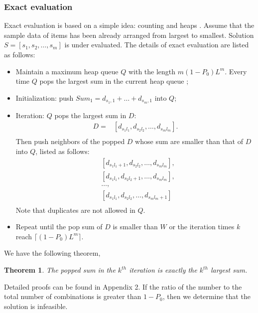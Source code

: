 \documentclass[lettersize,journal]{IEEEtran}
\newtheorem{theorem}{Theorem}[section]
\begin{document}
\subsubsection{Exact evaluation}
Exact evaluation is based on a simple idea: counting and heaps \cite{ferreira1996fast}.
Assume that the sample data of items has been already arranged from largest to smallest. 
Solution $S = [s_1,s_2,\ldots,s_m]$ is under evaluated. 
The details of exact evaluation are listed as follows:
\begin{itemize}
    \item Maintain a maximum heap queue $Q$ with the length $m(1-P_0)L^m$. Every time $Q$ pops the largest sum in the current heap queue \cite{ferreira1996fast};
    \item Initialization: push $Sum_1 = d_{s_1,1}+\ldots+d_{s_m,1}$ into $Q$;
    \item Iteration: $Q$ pops the largest sum in $D$:
    \begin{equation*}
        \begin{aligned}
           D =  &[d_{s_1l_1},d_{s_2l_2},\ldots,d_{s_ml_m}].\\
        \end{aligned}
    \end{equation*}
    Then push neighbors of the popped $D$ whose sum are smaller than that of $D$ into $Q$, listed as follows:
    \begin{equation*}
        \begin{aligned}
        &[d_{s_1l_1+1},d_{s_2l_2},\ldots,d_{s_ml_m}],\\
        &[d_{s_1l_1},d_{s_2l_2+1},\ldots,d_{s_ml_m}],\\
        &\ldots,\\
        &[d_{s_1l_1},d_{s_2l_2},\ldots,d_{s_ml_m+1}]\\
    \end{aligned}
    \end{equation*}
    Note that duplicates are not allowed in $Q$.
    \item Repeat until the pop sum of $D$ is smaller than $W$ or the iteration times $k$ reach $ \lceil(1-P_0)L^m\rceil$.
\end{itemize}

We have the following theorem,
\begin{theorem}
The popped sum in the $k^{th}$ iteration is exactly the $k^{th}$ largest sum.
\end{theorem}

Detailed proofs can be found in Appendix 2. If the ratio of the number to the total number of combinations is greater than $1-P_0$, then we determine that the solution is infeasible.
\end{document}
